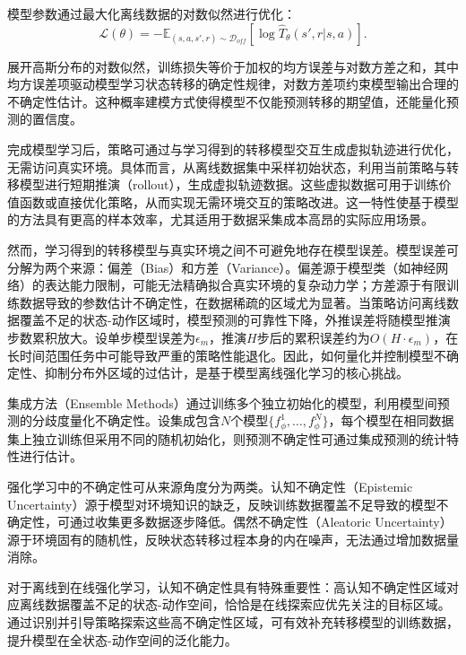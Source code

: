 模型参数通过最大化离线数据的对数似然进行优化：
\begin{equation}\label{Eq:Chap2_model_loss}
  \mathcal{L}(\theta) = -\mathbb{E}_{(s,a,s',r) \sim \mathcal{D}_{off}}[\log \hat{T}_{\theta}(s', r|s, a)].
\end{equation}

展开高斯分布的对数似然，训练损失等价于加权的均方误差与对数方差之和，其中均方误差项驱动模型学习状态转移的确定性规律，对数方差项约束模型输出合理的不确定性估计。这种概率建模方式使得模型不仅能预测转移的期望值，还能量化预测的置信度。

完成模型学习后，策略可通过与学习得到的转移模型交互生成虚拟轨迹进行优化，无需访问真实环境。具体而言，从离线数据集中采样初始状态，利用当前策略与转移模型进行短期推演（rollout），生成虚拟轨迹数据。这些虚拟数据可用于训练价值函数或直接优化策略，从而实现无需环境交互的策略改进。这一特性使基于模型的方法具有更高的样本效率，尤其适用于数据采集成本高昂的实际应用场景。

然而，学习得到的转移模型与真实环境之间不可避免地存在模型误差。模型误差可分解为两个来源：偏差（Bias）和方差（Variance）。偏差源于模型类（如神经网络）的表达能力限制，可能无法精确拟合真实环境的复杂动力学；方差源于有限训练数据导致的参数估计不确定性，在数据稀疏的区域尤为显著。当策略访问离线数据覆盖不足的状态-动作区域时，模型预测的可靠性下降，外推误差将随模型推演步数累积放大。设单步模型误差为$\epsilon_m$，推演$H$步后的累积误差约为$O(H \cdot \epsilon_m)$，在长时间范围任务中可能导致严重的策略性能退化。因此，如何量化并控制模型不确定性、抑制分布外区域的过估计，是基于模型离线强化学习的核心挑战。

集成方法（Ensemble Methods）通过训练多个独立初始化的模型，利用模型间预测的分歧度量化不确定性\cite{Lakshminarayanan2017Ensemble}。设集成包含$N$个模型$\{f_{\phi}^1, \ldots, f_{\phi}^N\}$，每个模型在相同数据集上独立训练但采用不同的随机初始化，则预测不确定性可通过集成预测的统计特性进行估计。

强化学习中的不确定性可从来源角度分为两类\cite{Charpentier2022Uncertainty}。认知不确定性（Epistemic Uncertainty）源于模型对环境知识的缺乏，反映训练数据覆盖不足导致的模型不确定性，可通过收集更多数据逐步降低。偶然不确定性（Aleatoric Uncertainty）源于环境固有的随机性，反映状态转移过程本身的内在噪声，无法通过增加数据量消除。

对于离线到在线强化学习，认知不确定性具有特殊重要性：高认知不确定性区域对应离线数据覆盖不足的状态-动作空间，恰恰是在线探索应优先关注的目标区域。通过识别并引导策略探索这些高不确定性区域，可有效补充转移模型的训练数据，提升模型在全状态-动作空间的泛化能力。

